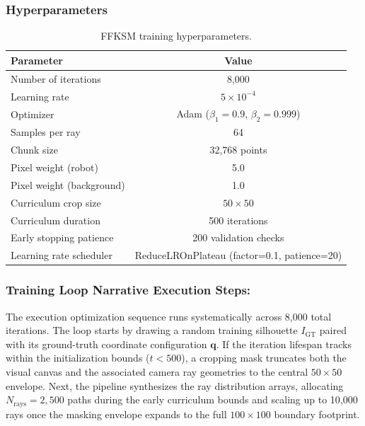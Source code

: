 \documentclass[12pt,a4paper,oneside]{report}
\begin{document}
\subsubsection{Hyperparameters}
\begin{table}[H]
\centering

\caption{FFKSM training hyperparameters.}
\label{tab:ffksm_hyperparams}
\begin{tabular}{lc}
\toprule

Parameter & Value \\
\midrule

Number of iterations & 8,000 \\

Learning rate & $5 \times 10^{-4}$ \\

Optimizer & Adam ($\beta_1=0.9$, $\beta_2=0.999$) \\

Samples per ray & 64 \\

Chunk size & 32,768 points \\

Pixel weight (robot) & 5.0 \\

Pixel weight (background) & 1.0 \\

Curriculum crop size & $50 \times 50$ \\

Curriculum duration & 500 iterations \\

Early stopping patience & 200 validation checks \\

Learning rate scheduler & ReduceLROnPlateau (factor=0.1, patience=20) \\
\bottomrule

\end{tabular}
\end{table}
\subsubsection{Training Loop Narrative Execution Steps:}

The execution optimization sequence runs systematically across 8,000 total iterations. The loop starts by drawing a random training silhouette $I_{\text{GT}}$ paired with its ground-truth coordinate configuration $\mathbf{q}$. If the iteration lifespan tracks within the initialization bounds ($t < 500$), a cropping mask truncates both the visual canvas and the associated camera ray geometries to the central $50 \times 50$ envelope. Next, the pipeline synthesizes the ray distribution arrays, allocating $N_{\text{rays}} = 2,500$ paths during the early curriculum bounds and scaling up to 10,000 rays once the masking envelope expands to the full $100 \times 100$ boundary footprint. 
\end{document}
